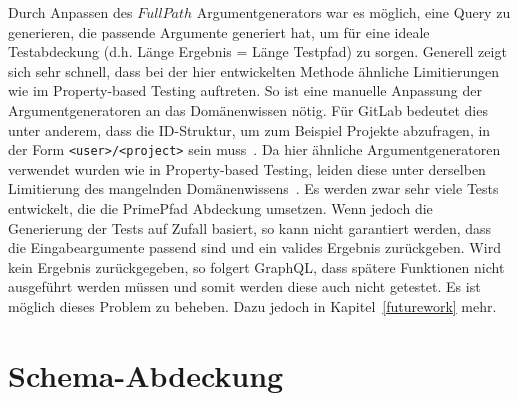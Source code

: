 Durch Anpassen des $FullPath$ Argumentgenerators war es möglich, eine Query zu generieren, die passende Argumente generiert hat, um für eine ideale Testabdeckung (d.h. Länge Ergebnis = Länge Testpfad) zu sorgen.
Generell zeigt sich sehr schnell, dass bei der hier entwickelten Methode ähnliche Limitierungen wie im Property-based Testing auftreten.
So ist eine manuelle Anpassung der Argumentgeneratoren an das Domänenwissen nötig.
Für GitLab bedeutet dies unter anderem, dass die ID-Struktur, um zum Beispiel Projekte abzufragen, in der Form \verb+<user>/<project>+ sein muss~\cite[vgl. S.8]{property-based-testing}.
Da hier ähnliche Argumentgeneratoren verwendet wurden wie in Property-based Testing, leiden diese unter derselben Limitierung des mangelnden Domänenwissens~\cite[vgl. S.8]{property-based-testing}.
Es werden zwar sehr viele Tests entwickelt, die die PrimePfad Abdeckung umsetzen.
Wenn jedoch die Generierung der Tests auf Zufall basiert, so kann nicht garantiert werden, dass die Eingabeargumente passend sind und ein valides Ergebnis zurückgeben.
Wird kein Ergebnis zurückgegeben, so folgert GraphQL, dass spätere Funktionen nicht ausgeführt werden müssen und somit werden diese auch nicht getestet.
Es ist möglich dieses Problem zu beheben.
Dazu jedoch in Kapitel~\ref{futurework} mehr.

\section{Schema-Abdeckung}

